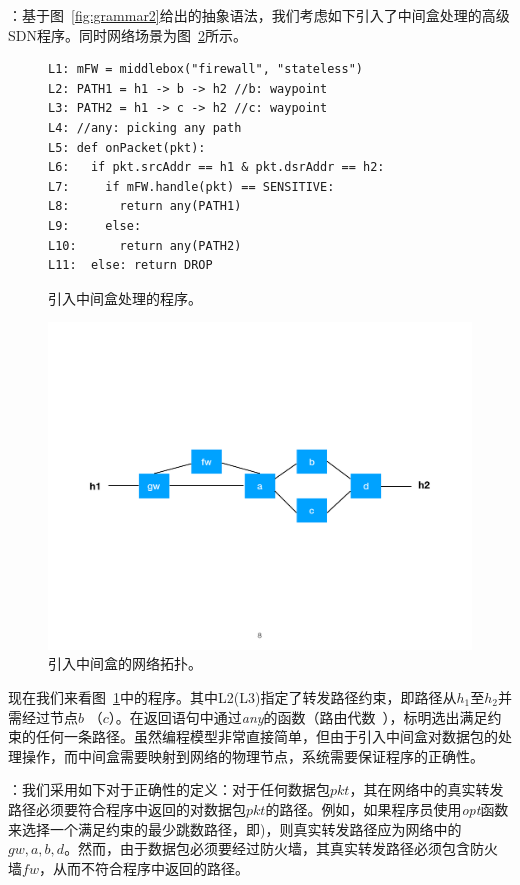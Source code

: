 ：基于图~\ref{fig:grammar2}给出的抽象语法，我们考虑如下引入了中间盒处理的高级SDN程序。同时网络场景为图~\ref{fig:topo2}所示。

\begin{figure}[h]
\begin{verbatim}
L1: mFW = middlebox("firewall", "stateless")
L2: PATH1 = h1 -> b -> h2 //b: waypoint
L3: PATH2 = h1 -> c -> h2 //c: waypoint
L4: //any: picking any path
L5: def onPacket(pkt):
L6:   if pkt.srcAddr == h1 & pkt.dsrAddr == h2:
L7:     if mFW.handle(pkt) == SENSITIVE:
L8:       return any(PATH1)
L9:     else:
L10:      return any(PATH2)
L11:  else: return DROP
\end{verbatim}
    \caption{\small 引入中间盒处理的程序。}
\label{fig:code2}
\end{figure}


\begin{figure}[!htbp]
\includegraphics[width=0.8\linewidth]{figures/global-topo2.pdf}
\centering
\caption{\small 引入中间盒的网络拓扑。}
\label{fig:topo2}
\end{figure}

现在我们来看图~\ref{fig:code2}中的程序。其中L2(L3)指定了转发路径约束，即路径从$h_1$至$h_2$并需经过节点$b$ （$c$）。在返回语句中通过\emph{any}的函数（路由代数~\cite{gao2018t}），标明选出满足约束的任何一条路径。虽然编程模型非常直接简单，但由于引入中间盒对数据包的处理操作，而中间盒需要映射到网络的物理节点，系统需要保证程序的正确性。

：我们采用如下对于正确性的定义：对于任何数据包$pkt$，其在网络中的真实转发路径必须要符合程序中返回的对数据包$pkt$的路径。例如，如果程序员使用\emph{opt}函数来选择一个满足约束的最少跳数路径，即)，则真实转发路径应为网络中的$gw, a, b, d$。然而，由于数据包必须要经过防火墙，其真实转发路径必须包含防火墙$fw$，从而不符合程序中返回的路径。

